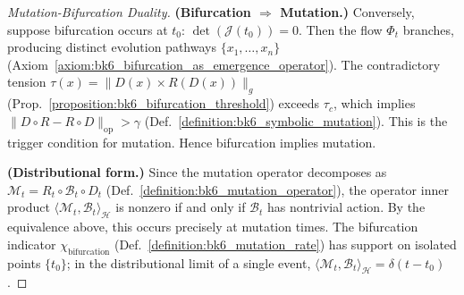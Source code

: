 \begin{proposition}
\begin{proof}[Mutation-Bifurcation Duality]
\textbf{(Bifurcation $\Rightarrow$ Mutation.)}
Conversely, suppose bifurcation occurs at $t_0$:
$\det(\mathcal{J}(t_0)) = 0$. Then the flow $\Phi_t$ branches,
producing distinct evolution pathways $\{x_1, \ldots, x_n\}$
(Axiom~\ref{axiom:bk6_bifurcation_as_emergence_operator}).
The contradictory tension
$\tau(x) = \|D(x) \times R(D(x))\|_g$
(Prop.~\ref{proposition:bk6_bifurcation_threshold}) exceeds
$\tau_c$, which implies $\|D \circ R - R \circ D\|_{\mathrm{op}} > \gamma$
(Def.~\ref{definition:bk6_symbolic_mutation}). This is the trigger
condition for mutation. Hence bifurcation implies mutation.

\textbf{(Distributional form.)}
Since the mutation operator decomposes as
$\mathcal{M}_t = R_t \circ \mathcal{B}_t \circ D_t$
(Def.~\ref{definition:bk6_mutation_operator}), the operator inner
product $\langle \mathcal{M}_t, \mathcal{B}_t \rangle_\mathcal{H}$
is nonzero if and only if $\mathcal{B}_t$ has nontrivial action.
By the equivalence above, this occurs precisely at mutation times.
The bifurcation indicator $\chi_\text{bifurcation}$
(Def.~\ref{definition:bk6_mutation_rate}) has support on isolated
points $\{t_0\}$; in the distributional limit of a single event,
$\langle \mathcal{M}_t, \mathcal{B}_t \rangle_\mathcal{H} = \delta(t - t_0)$.
\end{proof}
\end{proposition}
